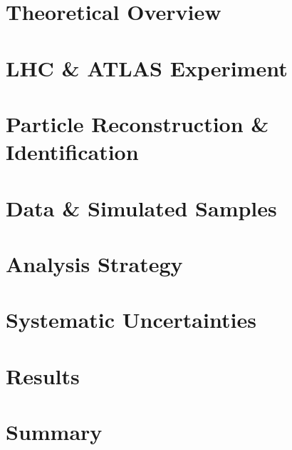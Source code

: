\documentclass{msuphddissertation}
\begin{document}
\begin{doublespace}
{\chapter{Theoretical Overview}
\label{chap:theory}


\chapter{LHC \& ATLAS Experiment}
\label{chap:LHCATLAS}


\chapter{Particle Reconstruction \& Identification}
\label{chap:reco}


\chapter{Data \& Simulated Samples}
\label{chap:samples}


\chapter{Analysis Strategy}
\label{chap:anal}


\chapter{Systematic Uncertainties}
\label{chap:sys}


\chapter{Results}
\label{chap:results}


\chapter{Summary}
\label{chap:summary}


}%



\end{doublespace}
\end{document}
